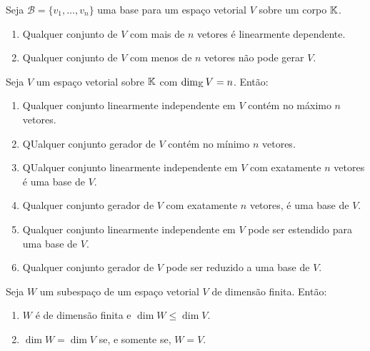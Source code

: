 \documentclass{beamer}
\begin{document}
\begin{frame}
  \begin{teorema}
    Seja $\mathcal{B} = \{v_1, \dots, v_n\}$ uma base para um espaço vetorial $V$ sobre um corpo $\mathbb{K}$.
    \begin{enumerate}[label={\roman*})]
      \item Qualquer conjunto  de $V$ com mais de $n$ vetores é linearmente dependente.

      \item Qualquer conjunto de $V$ com menos de $n$ vetores não pode gerar $V$.
    \end{enumerate}
  \end{teorema}
\end{frame}


\begin{frame}
  \begin{teorema}
    Seja $V$ um espaço vetorial sobre $\mathbb{K}$ com $\dim_{\mathbb{K}} V = n$. Então:
    \begin{enumerate}[label={\roman*})]
      \item Qualquer conjunto linearmente independente em $V$ contém no máximo $n$ vetores.
        
      \item QUalquer conjunto gerador de $V$ contém no mínimo $n$ vetores.

      \item QUalquer conjunto linearmente independente em $V$ com exatamente $n$ vetores é uma base de $V$.

      \item Qualquer conjunto gerador de $V$ com exatamente $n$ vetores, é uma base de $V$.

      \item Qualquer conjunto linearmente independente em $V$ pode ser estendido para uma base de $V$.

      \item Qualquer conjunto gerador de $V$ pode ser reduzido a uma base de $V$.
    \end{enumerate}
  \end{teorema}
\end{frame}

\begin{frame}
  \begin{teorema}
    Seja $W$ um subespaço de um espaço vetorial $V$ de dimensão finita. Então:
    \begin{enumerate}[label={\roman*})]
      \item $W$ é de dimensão finita e $\dim W \le \dim V$.

      \item $\dim W = \dim V$ se, e somente se, $W = V$.
    \end{enumerate}
  \end{teorema}
\end{frame}
\end{document}

